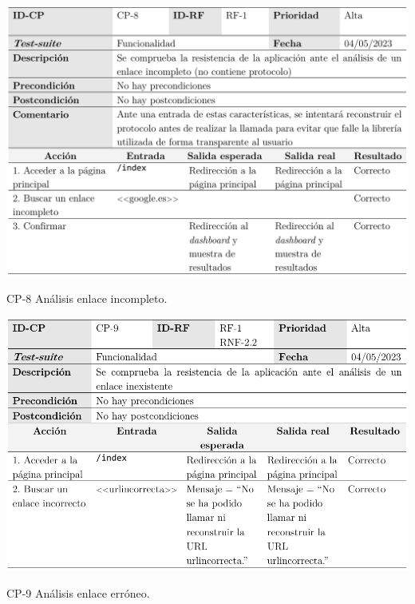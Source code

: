 \begin{table}[p]
	\centering
	\includegraphics[width=\textwidth]{../img/anexos/cp/CP-8}
	\caption{CP-8 Análisis enlace incompleto.}
	\label{cp:url-incompleta}
\end{table}

\begin{table}[p]
	\centering
	\includegraphics[width=\textwidth]{../img/anexos/cp/CP-9}
	\caption{CP-9 Análisis enlace erróneo.}
	\label{cp:wrong-url}
\end{table}

